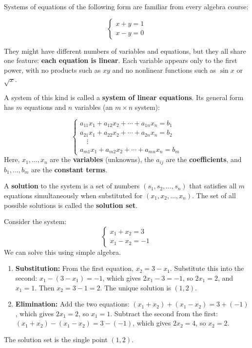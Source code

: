 Systems of equations of the following form are familiar from every algebra course:

\[
\begin{cases}
x+y=1\\
x-y =0
\end{cases}
\]

They might have different numbers of variables and equations, but they all share one feature: \textbf{each equation is linear}. Each variable appears only to the first power, with no products such as $xy$ and no nonlinear functions such as $\sin x$ or $\sqrt{x}$.

A system of this kind is called a \textbf{system of linear equations}. Its general form has $m$ equations and $n$ variables (an $m \times n$ system):

\[
\begin{cases}
a_{11}x_1 + a_{12}x_2 + \cdots + a_{1n}x_n = b_1\\
a_{21}x_1 + a_{22}x_2 + \cdots + a_{2n}x_n = b_2\\
\quad \vdots \\
a_{m1}x_1 + a_{m2}x_2 + \cdots + a_{mn}x_n = b_m
\end{cases}
\]
Here, $x_1, \ldots, x_n$ are the \textbf{variables} (unknowns), the $a_{ij}$ are the \textbf{coefficients}, and $b_1, \ldots, b_m$ are the \textbf{constant terms}.

A \textbf{solution} to the system is a set of numbers $(s_1, s_2, \ldots, s_n)$ that satisfies all $m$ equations simultaneously when substituted for $(x_1, x_2, \ldots, x_n)$. The set of all possible solutions is called the \textbf{solution set}.

\begin{example}
Consider the system:
\[
\begin{cases}
x_1 + x_2 = 3 \\
x_1 - x_2 = -1
\end{cases}
\]
We can solve this using simple algebra.
\begin{enumerate}
    \item \textbf{Substitution:} From the first equation, $x_2 = 3 - x_1$. Substitute this into the second: $x_1 - (3 - x_1) = -1$, which gives $2x_1 - 3 = -1$, so $2x_1 = 2$, and $x_1 = 1$. Then $x_2 = 3 - 1 = 2$. The unique solution is $(1, 2)$.
    \item \textbf{Elimination:} Add the two equations: $(x_1 + x_2) + (x_1 - x_2) = 3 + (-1)$, which gives $2x_1 = 2$, so $x_1 = 1$. Subtract the second from the first: $(x_1 + x_2) - (x_1 - x_2) = 3 - (-1)$, which gives $2x_2 = 4$, so $x_2 = 2$.
\end{enumerate}
The solution set is the single point $(1, 2)$.
\end{example}

